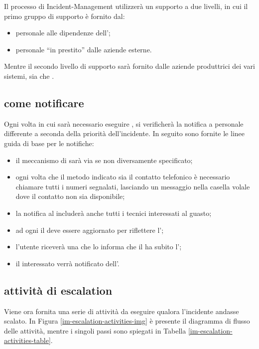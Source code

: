 Il processo di \ac{Incident-Management} utilizzerà un supporto a due livelli, in cui il primo gruppo di supporto è fornito dal:

\begin{itemize}
\item{personale alle dipendenze dell'\entity{};}
\item{personale ``in prestito'' dalle aziende esterne.}
\end{itemize}

Mentre il secondo livello di supporto sarà fornito dalle aziende produttrici dei vari sistemi, sia  che .

\clearpage{}
\subsection[come notificare]{come notificare}
\label{im-escalation-how-to}
Ogni volta in cui sarà necessario eseguire , si verificherà la notifica a personale differente a seconda della priorità dell'incidente. In seguito sono fornite le linee guida di base per le notifiche:

\begin{itemize}
\item{il meccanismo di  sarà via  se non diversamente specificato;}
\item{ogni volta che il metodo indicato sia il contatto telefonico è necessario chiamare tutti i numeri segnalati, lasciando un messaggio nella casella volale dove il contatto non sia disponibile;}
\item{la notifica al  includerà anche tutti i tecnici interessati al guasto;}
\item{ad ogni  il  deve essere aggiornato per riflettere l';}
\item{l'utente riceverà una  che lo informa che il  ha subito l';}
\item{il  interessato verrà notificato dell'.}
\end{itemize}

\subsection[Attività di escalation]{attività di escalation}
\label{im-escalation-activities}
Viene ora fornita una serie di attività da eseguire qualora l'incidente andasse scalato. In Figura \ref{im-escalation-activities-img} è presente il diagramma di flusso delle attività, mentre i singoli passi sono spiegati in Tabella \ref{im-escalation-activities-table}.

